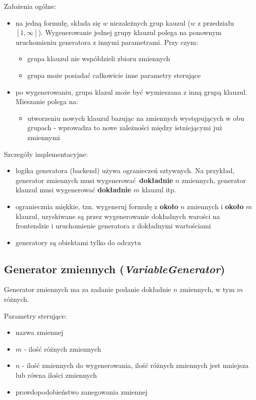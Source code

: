 \documentclass[a4paper,12pt]{article}
\begin{document}
\noindent
Założenia ogólne:
\begin{itemize}
  \item na jedną formułę, składa się $w$ niezależnych grup kauzul ($w$ z przedziału $[1, \infty]$). Wygenerowanie jednej grupy klauzul polega na ponownym uruchomieniu generatora z innymi parametrami. Przy czym:
    \begin{itemize}
      \item grupa klauzul nie współdzieli zbioru zmiennych
      \item grupa może posiadać całkowicie inne parametry sterujące
    \end{itemize}
  \item po wygenerowaniu, grupa klazul może być wymieszana z inną grupą klauzul. Mieszanie polega na:
    \begin{itemize}
      \item utworzeniu nowych klauzul bazując na zmiennych występujących w obu grupach - wprowadza to nowe zależności między istniejącymi już zmiennymi
    \end{itemize}
\end{itemize}

\noindent
Szczegóły implementacyjne:
\begin{itemize}
  \item logika generatora (backend) używa ogranieczeń sztywnych. Na przykład, generator zmiennych musi wygenerować \textbf{dokładnie} $n$ zmiennych, generator klauzul musi wygenerować \textbf{dokładnie} $m$ klauzul itp.
  \item ograniecznia miękkie, tzn. wygeneruj formułę z \textbf{około} $n$ zmiennych i \textbf{około} $m$ klauzul, uzyskiwane są przez wygenerowanie dokładnych warości na frontendzie i uruchomienie generatora z dokładnymi wartościami
  \item generatory są obiektami tylko do odczytu
\end{itemize}

\subsection{Generator zmiennych (\textit{VariableGenerator})}

Generator zmiennych ma za zadanie podanie dokładnie $n$ zmiennych, w tym $m$ różnych.

\noindent
Parametry sterujące:

\begin{itemize}
  \item nazwa zmiennej
  \item $m$ - ilość różnych zmiennych
  \item $n$ - ilość zmiennych do wygenerowania, ilość różnych zmiennych jest mniejsza lub równa ilości zmiennych
  \item prawdopodobieństwo zanegowania zmiennej
\end{itemize}
\end{document}
